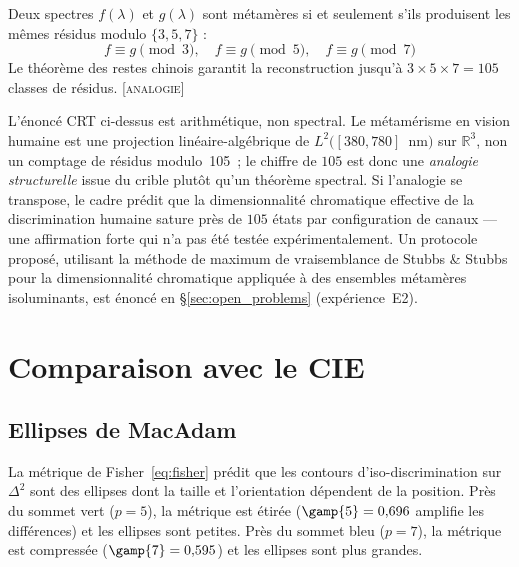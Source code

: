 \documentclass[12pt,a4paper]{article}
\begin{document}
\begin{theorembox}
Deux spectres $f(\lambda)$ et $g(\lambda)$ sont m\'etam\`eres si et
seulement s'ils produisent les m\^emes r\'esidus modulo $\{3, 5, 7\}$ :
\begin{equation}
  f \equiv g \pmod{3}, \quad
  f \equiv g \pmod{5}, \quad
  f \equiv g \pmod{7}
\end{equation}
Le th\'eor\`eme des restes chinois garantit la reconstruction jusqu'\`a
$3 \times 5 \times 7 = 105$ classes de r\'esidus. \textsc{[analogie]}
\end{theorembox}

\begin{remark}
L'\'enonc\'e CRT ci-dessus est arithm\'etique, non spectral. Le
m\'etam\'erisme en vision humaine est une projection
lin\'eaire-alg\'ebrique de $L^2([380, 780]$~nm$)$ sur $\mathbb{R}^3$,
non un comptage de r\'esidus modulo~105~; le chiffre de $105$ est
donc une \emph{analogie structurelle} issue du crible plut\^ot qu'un
th\'eor\`eme spectral. Si l'analogie se transpose, le cadre pr\'edit
que la dimensionnalit\'e chromatique effective de la discrimination
humaine sature pr\`es de $105$ \'etats par configuration de canaux
--- une affirmation forte qui n'a pas \'et\'e test\'ee
exp\'erimentalement. Un protocole propos\'e, utilisant la m\'ethode
de maximum de vraisemblance de Stubbs \& Stubbs pour la
dimensionnalit\'e chromatique appliqu\'ee \`a des ensembles
m\'etam\`eres isoluminants, est \'enonc\'e en \S\ref{sec:open_problems}
(exp\'erience~E2).
\end{remark}

\section{Comparaison avec le CIE}
\label{sec:comparison}

\subsection{Ellipses de MacAdam}

La m\'etrique de Fisher~\eqref{eq:fisher} pr\'edit que les contours
d'iso-discrimination sur $\Delta^2$ sont des ellipses dont la taille et
l'orientation d\'ependent de la position. Pr\`es du sommet vert
($p = 5$), la m\'etrique est \'etir\'ee ($\gamp{5} = 0{,}696$ amplifie
les diff\'erences) et les ellipses sont petites. Pr\`es du sommet bleu
($p = 7$), la m\'etrique est compress\'ee ($\gamp{7} = 0{,}595$) et les
ellipses sont plus grandes.
\end{document}
